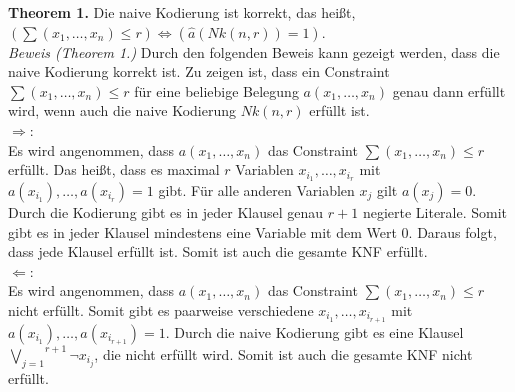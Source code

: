\documentclass[a4,abstract=on]{scrartcl}
\begin{document}
\textbf{Theorem 1.} Die naive Kodierung ist korrekt, das heißt, $(\sum (x_1, \dots, x_n) \leq r) \Leftrightarrow (\hat{a} (Nk(n,r)) = 1)$.\\
\newline
\textit{Beweis (Theorem 1.)} Durch den folgenden Beweis kann gezeigt werden, dass die naive Kodierung korrekt ist. Zu zeigen ist, dass ein Constraint $\sum(x_1, \dots,x_n) \leq r$ für eine beliebige Belegung $a(x_1, \dots ,x_n)$ genau dann erfüllt wird, wenn auch die naive Kodierung $Nk(n, r)$ erfüllt ist.\\
\glqq$\Rightarrow$\grqq:\\
Es wird angenommen, dass $a(x_1, \dots ,x_n)$ das Constraint $\sum(x_1, \dots,x_n) \leq r$ erfüllt. Das heißt, dass es maximal $r$ Variablen $x_{i_1}, \dots, x_{i_r}$ mit $a(x_{i_1}), \dots ,a(x_{i_r}) = 1$ gibt. Für alle anderen Variablen $x_j$ gilt $a(x_j) = 0$. Durch die Kodierung gibt es in jeder Klausel genau $r+1$ negierte Literale. Somit gibt es in jeder Klausel mindestens eine Variable mit dem Wert $0$. Daraus folgt, dass jede Klausel erfüllt ist. Somit ist auch die gesamte KNF erfüllt.\\
\glqq$\Leftarrow$\grqq:\\
Es wird angenommen, dass $a(x_1, \dots ,x_n)$ das Constraint $\sum(x_1, \dots,x_n) \leq r$ nicht erfüllt. Somit gibt es paarweise verschiedene $x_{i_1}, \dots, x_{i_{r+1}}$ mit $a(x_{i_1}), \dots ,a(x_{i_{r+1}}) = 1$. Durch die naive Kodierung gibt es eine Klausel $\overset{r+1}{\underset{j=1}{\bigvee}} {\neg x_{i_j}}$, die nicht erfüllt wird. Somit ist auch die gesamte KNF nicht erfüllt.\\
 \qedsymbol
\end{document}
